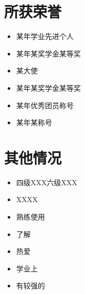 
     \section{\makebox[\widthof{\faStar}][c]{\color{WHU_Blue}{\faStar}}\quad 所获荣誉}
     \vspace{-1em}
     \begin{multicols}{2}
         \begin{itemize}
             \item 某年学业先进个人
             \item 某年某奖学金某等奖
             \item 某大使
             \item 某年某奖学金某等奖
             \item 某年优秀团员称号
             \item 某年某称号
         \end{itemize}
     \end{multicols}

     \section{\makebox[\widthof{\faInfo}][c]{\color{WHU_Blue}{\faInfo}}\quad 其他情况}
     \begin{itemize}
         \item 四级XXX六级XXX
         \item XXXX
         \item 熟练使用
         \item 了解
         \item 热爱
         \item 学业上
         \item 有较强的
         
     \end{itemize}


